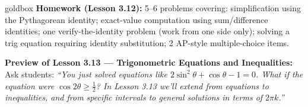 \documentclass[10pt]{article}
\begin{document}
\vspace{0.08in}

\begin{skillbox}{goldbox}
\textbf{Homework (Lesson 3.12):} 5--6 problems covering: simplification using
the Pythagorean identity; exact-value computation using sum/difference identities;
one verify-the-identity problem (work from one side only); solving a trig equation
requiring identity substitution; 2 AP-style multiple-choice items.

\textbf{Preview of Lesson 3.13 --- Trigonometric Equations and Inequalities:}
Ask students: \textit{``You just solved equations like $2\sin^2\theta + \cos\theta - 1 = 0$.
What if the equation were $\cos 2\theta \geq \tfrac{1}{2}$? In Lesson 3.13 we'll extend
from equations to inequalities, and from specific intervals to general solutions in terms
of $2\pi k$.''}
\end{skillbox}
\end{document}
